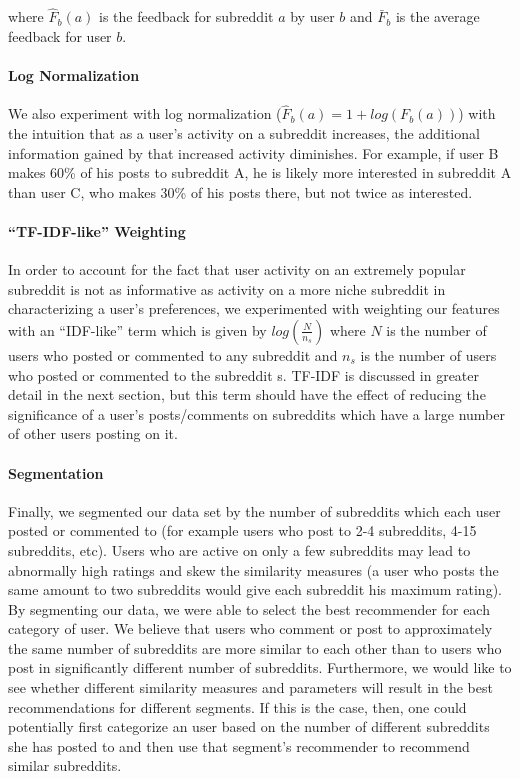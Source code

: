 \documentclass{article}
\begin{document}
where $\hat{F}_{b}(a)$ is the feedback for subreddit $a$ by user $b$ and $\bar{F}_b$ is the average feedback for user $b$.

\paragraph{Log Normalization} We also experiment with log normalization ($\hat{F}_{b}(a) = 1 + log(F_{b}(a))$) with the intuition that as a user's activity on a subreddit increases, the additional information gained by that increased activity diminishes.  For example, if user B makes 60\% of his posts to subreddit A, he is likely more interested in subreddit A than user C, who makes 30\% of his posts there, but not twice as interested.

\paragraph{“TF-IDF-like” Weighting} In order to account for the fact that user activity on an extremely popular subreddit is not as informative as activity on a more niche subreddit in characterizing a user’s preferences, we experimented with weighting our features with an “IDF-like” term which is given by $log(\frac{N}{n_s})$ where $N$ is the number of users who posted or commented to any subreddit and $n_s$ is the number of users who posted or commented to the subreddit s.  TF-IDF is discussed in greater detail in the next section, but this term should have the effect of reducing the significance of a user's posts/comments on subreddits which have a large number of other users posting on it. 

\paragraph{Segmentation} Finally, we segmented our data set by the number of subreddits which each user posted or commented to (for example users who post to 2-4 subreddits, 4-15 subreddits, etc).  Users who are active on only a few subreddits may lead to abnormally high ratings and skew the similarity measures (a user who posts the same amount to two subreddits would give each subreddit his maximum rating).  By segmenting our data, we were able to select the best recommender for each category of user. We believe that users who comment or post to approximately the same 
number of subreddits are more similar to each other than to users who post in significantly different number of subreddits. Furthermore, we would like to see whether different similarity measures and parameters will result in the best 
recommendations for different segments. If this is the case, then, one could potentially first categorize an user
based on the number of different subreddits she has posted to and then use that segment's recommender to 
recommend similar subreddits.
\end{document}
